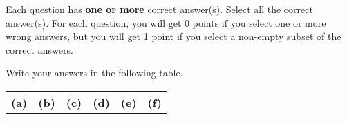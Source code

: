 
Each question has \underline{\textbf{one or more}} correct answer(s). Select all the correct answer(s). For each question, you will get 0 points if you select one or more wrong answers, but you will get 1 point if you select a non-empty subset of the correct answers.

Write your answers in the following table.


\begin{table}[htbp]
	\centering
	\begin{tabular}{|p{1.5cm}|p{1.5cm}|p{1.5cm}|p{1.5cm}|p{1.5cm}|p{1.5cm}|}
		\hline
		(a) & (b) & (c) & (d) & (e) & (f) \\
		\hline
		    &     &     &     &     &     \\
		\hline
	\end{tabular}
\end{table}

